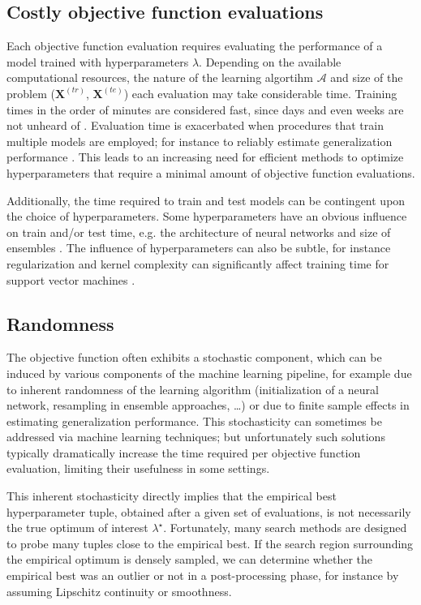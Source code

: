 \documentclass{mic2015}
\newcommand{\train}{\mathbf{X}^{(tr)}}
\newcommand{\test}{\mathbf{X}^{(te)}}
\begin{document}
\subsection{Costly objective function evaluations} \label{time}
Each objective function evaluation requires evaluating the performance of a model trained with hyperparameters $\lambda$. Depending on the available computational resources, the nature of the learning algortihm $\mathcal{A}$ and size of the problem ($\train$, $\test$) each evaluation may take considerable time. Training times in the order of minutes are considered fast, since days and even weeks are not unheard of \citep{krizhevsky2012imagenet, dean2012large, sutskever2014sequence}. Evaluation time is exacerbated when procedures that train multiple models are employed; for instance to reliably estimate generalization performance \citep{efron1983leisurely,kohavi1995study}. This leads to an increasing need for efficient methods to optimize hyperparameters that require a minimal amount of objective function evaluations.

Additionally, the time required to train and test models can be contingent upon the choice of hyperparameters. Some hyperparameters have an obvious influence on train and/or test time, e.g. the architecture of neural networks \citep{bishop1995neural} and size of ensembles \citep{breiman2001random, ensemblesvm-jmlr}. The influence of hyperparameters can also be subtle, for instance regularization and kernel complexity can significantly affect training time for support vector machines \citep{bottou07svm}.


\subsection{Randomness} \label{randomness}
The objective function often exhibits a stochastic component, which can be induced by various components of the machine learning pipeline, for example due to inherent randomness of the learning algorithm (initialization of a neural network, resampling in ensemble approaches, \ldots) or due to finite sample effects in estimating generalization performance. This stochasticity can sometimes be addressed via machine learning techniques; but unfortunately such solutions typically dramatically increase the time required per objective function evaluation, limiting their usefulness in some settings.

This inherent stochasticity directly implies that the empirical best hyperparameter tuple, obtained after a given set of evaluations, is not necessarily the true optimum of interest $\lambda^\star$. Fortunately, many search methods are designed to probe many tuples close to the empirical best. If the search region surrounding the empirical optimum is densely sampled, we can determine whether the empirical best was an outlier or not in a post-processing phase, for instance by assuming Lipschitz continuity or smoothness.
\end{document}
